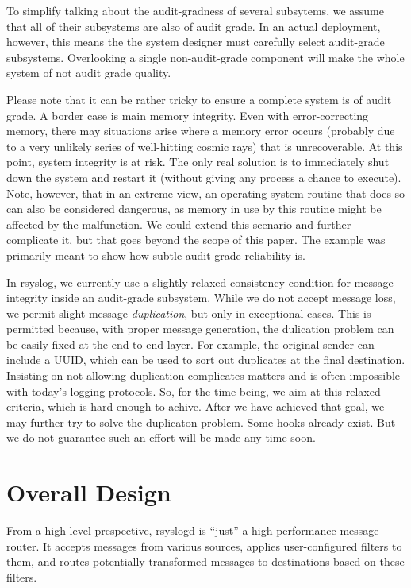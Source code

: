 \documentclass[a4paper,10pt]{article}
\begin{document}
To simplify talking about the audit-gradness of several subsytems, we assume that all of their subsystems are also of audit grade. In an actual deployment, however, this means the the system designer must carefully select audit-grade subsystems. Overlooking a single non-audit-grade component will make the whole system of not audit grade quality.

Please note that it can be rather tricky to ensure a complete system is of audit grade. A border case is main memory integrity. Even with error-correcting memory, there may situations arise where a memory error occurs (probably due to a very unlikely series of well-hitting cosmic rays) that is unrecoverable. At this point, system integrity is at risk. The only real solution is to immediately shut down the system and restart it (without giving any process a chance to execute). Note, however, that in an extreme view, an operating system routine that does so can also be considered dangerous, as memory in use by this routine might be affected by the malfunction. We could extend this scenario and further complicate it, but that goes beyond the scope of this paper. The example was primarily meant to show how subtle audit-grade reliability is.

In rsyslog, we currently use a slightly relaxed consistency condition for message integrity inside an audit-grade subsystem. While we do not accept message loss, we permit slight message \emph{duplication}, but only in exceptional cases. This is permitted because, with proper message generation, the dulication problem can be easily fixed at the end-to-end layer. For example, the original sender can include a UUID, which can be used to sort out duplicates at the final destination. Insisting on not allowing duplication complicates matters and is often impossible with today's logging protocols. So, for the time being, we aim at this relaxed criteria, which is hard enough to achive. After we have achieved that goal, we may further try to solve the duplicaton problem. Some hooks already exist. But we do not guarantee such an effort will be made any time soon.

\section{Overall Design}
From a high-level prespective, rsyslogd is ``just'' a high-performance message router. It accepts messages from various sources, applies user-configured filters to them, and routes potentially transformed messages to destinations based on these filters.
\end{document}
